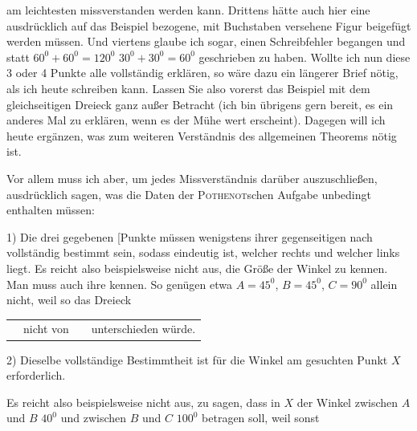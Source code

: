 %
am leichtesten missverstanden werden kann. Drittens hätte auch hier eine ausdrücklich auf das Beispiel bezogene, mit Buchstaben versehene Figur beigefügt werden müssen. Und viertens glaube ich sogar, einen Schreibfehler begangen und statt $60^0+60^0=120^0$ $30^0+30^0=60^0$ geschrieben zu haben. Wollte ich nun diese 3 oder 4 Punkte alle vollständig erklären, so wäre dazu ein längerer Brief nötig, als ich heute schreiben kann. Lassen Sie also vorerst das Beispiel mit dem gleichseitigen Dreieck ganz außer Betracht (ich bin übrigens gern bereit, es ein anderes Mal zu erklären, wenn es der Mühe wert erscheint). Dagegen will ich heute ergänzen, was zum weiteren Verständnis des allgemeinen Theorems nötig ist.

Vor allem muss ich aber, um jedes Missverständnis darüber auszuschließen, ausdrücklich sagen, was die Daten der \textsc{Pothenot}schen Aufgabe unbedingt enthalten müssen:

1) Die drei gegebenen [Punkte müssen wenigstens ihrer gegenseitigen  nach vollständig bestimmt sein, sodass eindeutig ist, welcher rechts und welcher links liegt. Es reicht also beispielsweise nicht aus, die Größe der Winkel zu kennen. Man muss auch ihre  kennen. So genügen etwa $A=45^0$, $B=45^0$, $C=90^0$ allein nicht, weil so das Dreieck

\begin{center}\begin{tabular}{c@{\quad}c@{\quad}c@{\quad}l}&nicht von&&unterschieden würde.\end{tabular}\end{center}

2) Dieselbe vollständige Bestimmtheit ist für die Winkel am gesuchten Punkt $X$ erforderlich.

Es reicht also beispielsweise nicht aus, zu sagen, dass in $X$ der Winkel zwischen $A$ und $B$ $40^0$ und zwischen $B$ und $C$ $100^0$ betragen soll, weil sonst

\begin{center}\hspace{.8cm}\end{center}

